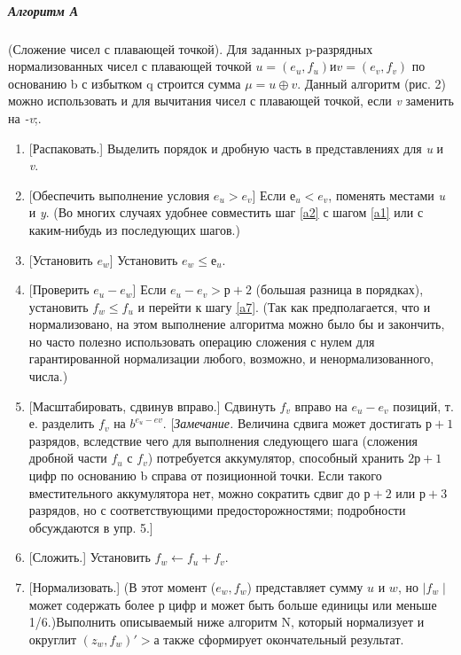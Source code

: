 \subparagraph{Алгоритм А} (Сложение чисел с плавающей точкой). Для заданных p-разрядных нормализованных чисел с плавающей точкой $u = (e_u,f_u) и v = (e_v,f_v)$ по основанию b с избытком q строится сумма $\mu = u \oplus v$. Данный алгоритм (рис. 2) можно использовать и для вычитания чисел с плавающей точкой, если \textit{v} заменить на \textit{-v};.
\begin{enumerate}[label=A{\arabic*}]
\item\label{a1} [Распаковать.] Выделить порядок и дробную часть в представлениях для \textit{u} и \textit{v}.

\item\label{a2} [Обеспечить выполнение условия $e_u > e_v$] Если $е_u < e_v$, поменять местами \textit{u} и \textit{y}. (Во многих случаях удобнее совместить шаг \ref{a2} с шагом \ref{a1} или с каким-нибудь из последующих шагов.)

\item\label{a3} [Установить $e_w$] Установить $e_w \leqslant е_u$.

\item\label{a4} [Проверить $e_u - e_w$] Если $e_u - e_v > р + 2$ (большая разница в порядках), установить $f_w \leqslant f_u$ и перейти к шагу \ref{a7}. (Так как предполагается, что и нормализовано, на этом выполнение алгоритма можно было бы и закончить, но часто полезно использовать операцию сложения с нулем для гарантированной нормализации любого, возможно, и ненормализованного, числа.)

\item\label{a5} [Масштабировать, сдвинув вправо.] Сдвинуть $f_v$ вправо на $e_u - e_v$ позиций, т. е. разделить $f_v$ на $b^{e_u-ev}$. [\textit{Замечание.} Величина сдвига может достигать $р + 1$ разрядов, вследствие чего для выполнения следующего шага (сложения дробной части $f_u$ с $f_v$) потребуется аккумулятор, способный хранить $2р + 1$ цифр по основанию b справа от позиционной точки. Если такого вместительного аккумулятора нет, можно сократить сдвиг до $р + 2$ или $р + 3$ разрядов, но с соответствующими предосторожностями; подробности обсуждаются в упр. 5.]

\item\label{a6} [Сложить.] Установить $f_w \leftarrow f_u + f_v$.

\item\label{a7} [Нормализовать.] (В этот момент ($e_w,f_w$) представляет сумму $u$ и $w$, но $\mid f_w\mid$ может содержать более р цифр и может быть больше единицы или меньше 1/6.)Выполнить описываемый ниже алгоритм N, который нормализует и округлит $(z_w,f_w)'> а$ также сформирует окончательный результат.


\end{enumerate}


